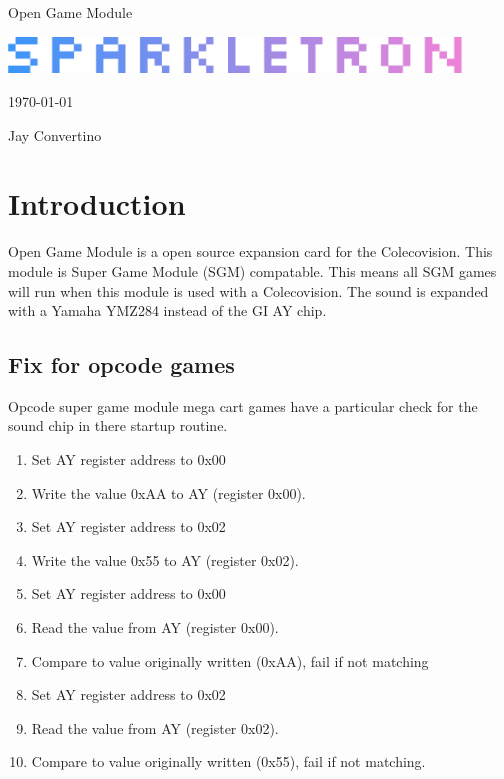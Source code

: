 \begin{titlepage}
  \begin{center}

  {\Huge Open Game Module}

  \vspace{25mm}

  \includegraphics[width=0.90\textwidth,height=\textheight,keepaspectratio]{img/SPARKLETRON.png}

  \vspace{25mm}

  \today

  \vspace{15mm}

  {\Large Jay Convertino}

  \end{center}
\end{titlepage}

\tableofcontents

\newpage

\section{Introduction}

\par
Open Game Module is a open source expansion card for the Colecovision. This module is Super Game Module (SGM) compatable.
This means all SGM games will run when this module is used with a Colecovision. The sound is expanded with a Yamaha YMZ284
instead of the GI AY chip.

\subsection{Fix for opcode games}

Opcode super game module mega cart games have a particular check for the sound chip in there startup routine.

\begin{enumerate}
  \item Set AY register address to 0x00
  \item Write the value 0xAA to AY (register 0x00).
  \item Set AY register address to 0x02
  \item Write the value 0x55 to AY (register 0x02).
  \item Set AY register address to 0x00
  \item Read the value from AY (register 0x00).
  \item Compare to value originally written (0xAA), fail if not matching
  \item Set AY register address to 0x02
  \item Read the value from AY (register 0x02).
  \item Compare to value originally written (0x55), fail if not matching.
\end{enumerate}

